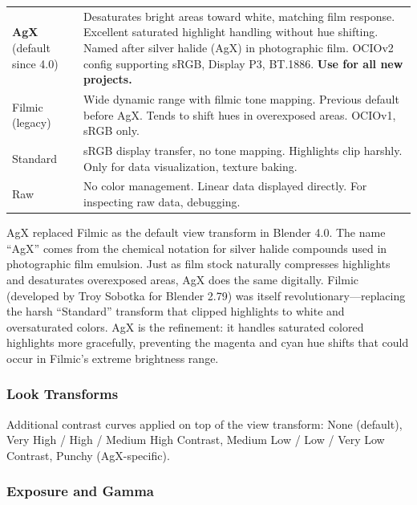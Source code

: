 \begin{center}
\begin{tabularx}{\textwidth}{L{2cm}X}
\toprule
{}
 &  \\
\midrule
\textbf{AgX} (default since 4.0) & Desaturates bright areas toward white, matching film response. Excellent saturated highlight handling without hue shifting. Named after silver halide (AgX) in photographic film. OCIOv2 config supporting sRGB, Display P3, BT.1886. \textbf{Use for all new projects.} \\
Filmic (legacy) & Wide dynamic range with filmic tone mapping. Previous default before AgX. Tends to shift hues in overexposed areas. OCIOv1, sRGB only. \\
Standard & sRGB display transfer, no tone mapping. Highlights clip harshly. Only for data visualization, texture baking. \\
Raw & No color management. Linear data displayed directly. For inspecting raw data, debugging. \\
\bottomrule
\end{tabularx}
\end{center}

\begin{historynote}
AgX replaced Filmic as the default view transform in Blender 4.0.
The name ``AgX'' comes from the chemical notation for silver halide
compounds used in photographic film emulsion. Just as film stock
naturally compresses highlights and desaturates overexposed areas,
AgX does the same digitally. Filmic (developed by Troy Sobotka for
Blender 2.79) was itself revolutionary---replacing the harsh
``Standard'' transform that clipped highlights to white and
oversaturated colors. AgX is the refinement: it handles saturated
colored highlights more gracefully, preventing the magenta and
cyan hue shifts that could occur in Filmic's extreme brightness
range.
\end{historynote}

\subsubsection{Look Transforms}

Additional contrast curves applied on top of the view transform:
None (default), Very High / High / Medium High Contrast, Medium Low
/ Low / Very Low Contrast, Punchy (AgX-specific).

\subsubsection{Exposure and Gamma}

